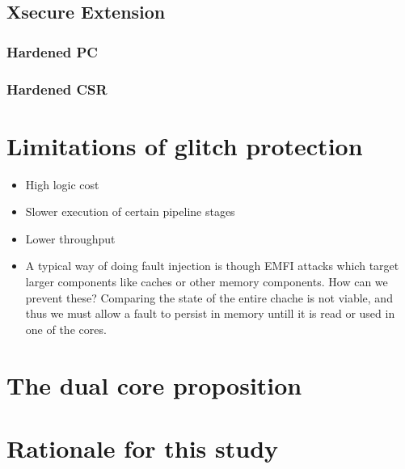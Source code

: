 \subsection{Xsecure Extension}
\subsubsection{Hardened PC}
\subsubsection{Hardened CSR}
\section{Limitations of glitch protection}
\label{sec:limits}

\begin{itemize}
    \item High logic cost 
    \item Slower execution of certain pipeline stages
    \item Lower throughput 
    \item A typical way of doing fault injection is though EMFI attacks which target larger components like caches or other memory components.
    How can we prevent these? Comparing the state of the entire chache is not viable, and thus we must allow a fault to persist in 
    memory untill it is read or used in one of the cores.
\end{itemize}
\section{The dual core proposition}
\section{Rationale for this study}

